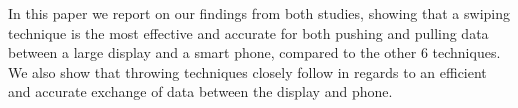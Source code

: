 In this paper we report on our findings from both studies, showing that a swiping technique is the most effective and accurate for both pushing and pulling data between a large display and a smart phone, compared to the other 6 techniques. 
We also show that throwing techniques closely follow in regards to an efficient and accurate exchange of data between the display and phone. 